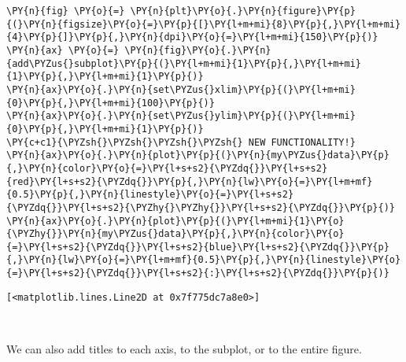     \begin{tcolorbox}[breakable, size=fbox, boxrule=1pt, pad at break*=1mm,colback=cellbackground, colframe=cellborder]
\begin{Verbatim}[commandchars=\\\{\}]
\PY{n}{fig} \PY{o}{=} \PY{n}{plt}\PY{o}{.}\PY{n}{figure}\PY{p}{(}\PY{n}{figsize}\PY{o}{=}\PY{p}{[}\PY{l+m+mi}{8}\PY{p}{,}\PY{l+m+mi}{4}\PY{p}{]}\PY{p}{,}\PY{n}{dpi}\PY{o}{=}\PY{l+m+mi}{150}\PY{p}{)} 
\PY{n}{ax} \PY{o}{=} \PY{n}{fig}\PY{o}{.}\PY{n}{add\PYZus{}subplot}\PY{p}{(}\PY{l+m+mi}{1}\PY{p}{,}\PY{l+m+mi}{1}\PY{p}{,}\PY{l+m+mi}{1}\PY{p}{)}
\PY{n}{ax}\PY{o}{.}\PY{n}{set\PYZus{}xlim}\PY{p}{(}\PY{l+m+mi}{0}\PY{p}{,}\PY{l+m+mi}{100}\PY{p}{)}
\PY{n}{ax}\PY{o}{.}\PY{n}{set\PYZus{}ylim}\PY{p}{(}\PY{l+m+mi}{0}\PY{p}{,}\PY{l+m+mi}{1}\PY{p}{)}
\PY{c+c1}{\PYZsh{}\PYZsh{}\PYZsh{}\PYZsh{} NEW FUNCTIONALITY!}
\PY{n}{ax}\PY{o}{.}\PY{n}{plot}\PY{p}{(}\PY{n}{my\PYZus{}data}\PY{p}{,}\PY{n}{color}\PY{o}{=}\PY{l+s+s2}{\PYZdq{}}\PY{l+s+s2}{red}\PY{l+s+s2}{\PYZdq{}}\PY{p}{,}\PY{n}{lw}\PY{o}{=}\PY{l+m+mf}{0.5}\PY{p}{,}\PY{n}{linestyle}\PY{o}{=}\PY{l+s+s2}{\PYZdq{}}\PY{l+s+s2}{\PYZhy{}\PYZhy{}}\PY{l+s+s2}{\PYZdq{}}\PY{p}{)}
\PY{n}{ax}\PY{o}{.}\PY{n}{plot}\PY{p}{(}\PY{l+m+mi}{1}\PY{o}{\PYZhy{}}\PY{n}{my\PYZus{}data}\PY{p}{,}\PY{n}{color}\PY{o}{=}\PY{l+s+s2}{\PYZdq{}}\PY{l+s+s2}{blue}\PY{l+s+s2}{\PYZdq{}}\PY{p}{,}\PY{n}{lw}\PY{o}{=}\PY{l+m+mf}{0.5}\PY{p}{,}\PY{n}{linestyle}\PY{o}{=}\PY{l+s+s2}{\PYZdq{}}\PY{l+s+s2}{:}\PY{l+s+s2}{\PYZdq{}}\PY{p}{)}
\end{Verbatim}
\end{tcolorbox}

            \begin{tcolorbox}[breakable, size=fbox, boxrule=.5pt, pad at break*=1mm, opacityfill=0]
\begin{Verbatim}[commandchars=\\\{\}]
[<matplotlib.lines.Line2D at 0x7f775dc7a8e0>]
\end{Verbatim}
\end{tcolorbox}
        
    \begin{center}
    \end{center}
    { \hspace*{\fill} \\}
    
    We can also add titles to each axis, to the subplot, or to the entire
figure.


